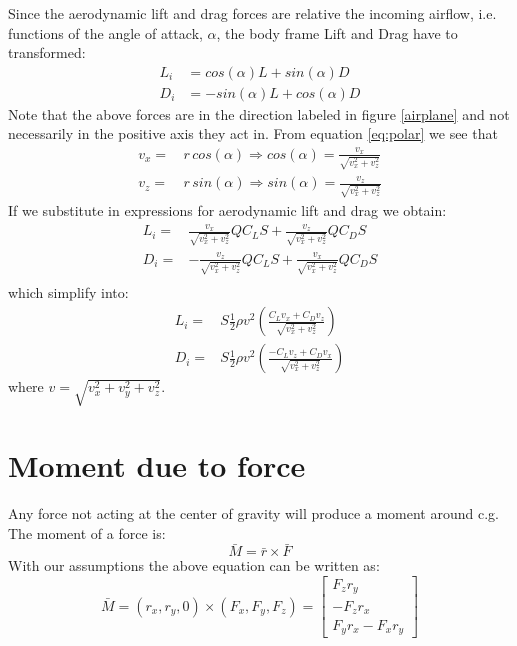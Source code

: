 Since the aerodynamic lift and drag forces are relative the incoming airflow, i.e. functions of the angle of attack, $\alpha$, the body frame Lift and Drag have to transformed:
\begin{equation}\begin{split}
    L_i &= cos(\alpha) L + sin(\alpha) D \\
    D_i &= -sin(\alpha) L + cos(\alpha) D
    \label{LDbodyframe}
\end{split}\end{equation}
Note that the above forces are in the direction labeled in figure \ref{airplane} and not necessarily in the positive axis they act in.
From equation \ref{eq:polar} we see that
\begin{equation}\begin{split}
    v_x =& \, r \, cos(\alpha) \Rightarrow cos(\alpha) = \frac{v_x}{\sqrt{v_x^2 + v_z^2}} \\
    v_z =& \, r \, sin(\alpha) \Rightarrow sin(\alpha) = \frac{v_z}{\sqrt{v_x^2 + v_z^2}}
\end{split}\end{equation}
If we substitute in expressions for aerodynamic lift and drag we obtain:
\begin{equation}\begin{split}
    L_i =&  \frac{v_x}{\sqrt{v_x^2 + v_z^2}} Q C_L S +
            \frac{v_z}{\sqrt{v_x^2 + v_z^2}} Q C_D S \\
    D_i =& -\frac{v_z}{\sqrt{v_x^2 + v_z^2}} Q C_L S +
            \frac{v_x}{\sqrt{v_x^2 + v_z^2}} Q C_D S \\          
\end{split}\end{equation}
which simplify into:
\begin{equation}\begin{split}
    L_i =& 
     S \frac{1}{2} \rho v^2 \left( \frac{C_L v_x + C_D v_z}{\sqrt{v_x^2 + v_z^2}} \right) \\
    D_i =& 
     S \frac{1}{2} \rho v^2 \left( \frac{-C_L v_z + C_D v_x}{\sqrt{v_x^2 + v_z^2}} \right)
     \label{liftdragbody}
\end{split}\end{equation}
where $v = \sqrt{v_x^2 + v_y^2 + v_z^2}$.


\section{Moment due to force}

Any force not acting at the center of gravity will produce a moment around c.g.
The moment of a force is:
\begin{equation}
    \bar{M} = \bar{r} \times \bar{F}
\end{equation}
With our assumptions the above equation can be written as:
\begin{equation}
    \bar{M} = (r_x, r_y, 0) \times (F_x, F_y, F_z) = 
    \left[ \begin{matrix}
    F_z r_y \\
    -F_z r_x \\
    F_y r_x - F_x r_y \end{matrix} \right]
\end{equation}

